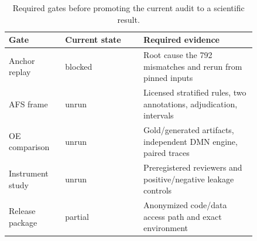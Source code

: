 \begin{table}[h]
\centering
\caption{Required gates before promoting the current audit to a scientific result.}
\label{tab:publication-gates}
\small
\begin{tabular}{p{0.18\linewidth}p{0.27\linewidth}p{0.39\linewidth}}
\toprule
Gate & Current state & Required evidence \\
\midrule
Anchor replay & blocked & Root cause the 792 mismatches and rerun from pinned inputs \\
AFS frame & unrun & Licensed stratified rules, two annotations, adjudication, intervals \\
OE comparison & unrun & Gold/generated artifacts, independent DMN engine, paired traces \\
Instrument study & unrun & Preregistered reviewers and positive/negative leakage controls \\
Release package & partial & Anonymized code/data access path and exact environment \\
\bottomrule
\end{tabular}
\end{table}
